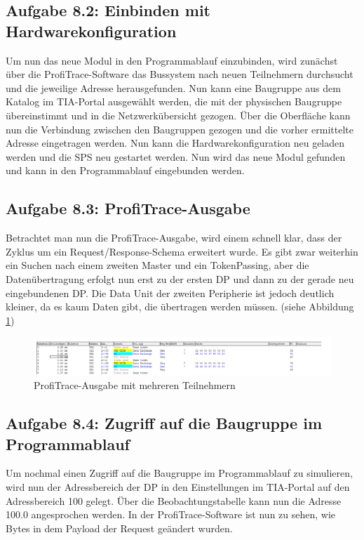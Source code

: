 \documentclass{report}
\begin{document}
\subsection{Aufgabe 8.2: Einbinden mit Hardwarekonfiguration}
Um nun das neue Modul in den Programmablauf einzubinden, wird zunächst über die ProfiTrace-Software das Bussystem nach neuen Teilnehmern durchsucht und die jeweilige Adresse herausgefunden. Nun kann eine Baugruppe aus dem Katalog im TIA-Portal ausgewählt werden, die mit der physischen Baugruppe übereinstimmt und in die Netzwerkübersicht gezogen. Über die Oberfläche kann nun die Verbindung zwischen den Baugruppen gezogen und die vorher ermittelte Adresse eingetragen werden. Nun kann die Hardwarekonfiguration neu geladen werden und die SPS neu gestartet werden. Nun wird das neue Modul gefunden und kann in den Programmablauf eingebunden werden.

\subsection{Aufgabe 8.3: ProfiTrace-Ausgabe}

Betrachtet man nun die ProfiTrace-Ausgabe, wird einem schnell klar, dass der Zyklus um ein Request/Response-Schema erweitert wurde. Es gibt zwar weiterhin ein Suchen nach einem zweiten Master und ein TokenPassing, aber die Datenübertragung erfolgt nun erst zu der ersten DP und dann zu der gerade neu eingebundenen DP. Die Data Unit der zweiten Peripherie ist jedoch deutlich kleiner, da es kaum Daten gibt, die übertragen werden müssen. (siehe Abbildung \ref{fig:profitrace_mehrteilnehmer})

\begin{figure}
  \centering
  \includegraphics[width=\textwidth]{assets/img/profitrace_mehrteilnehmer.png}
  \caption{ProfiTrace-Ausgabe mit mehreren Teilnehmern}
  \label{fig:profitrace_mehrteilnehmer}
\end{figure}

\subsection{Aufgabe 8.4: Zugriff auf die Baugruppe im Programmablauf}

Um nochmal einen Zugriff auf die Baugruppe im Programmablauf zu simulieren, wird nun der Adressbereich der DP in den Einstellungen im TIA-Portal auf den Adressbereich 100 gelegt. Über die Beobachtungstabelle kann nun die Adresse 100.0 angesprochen werden. In der ProfiTrace-Software ist nun zu sehen, wie Bytes in dem Payload der Request geändert wurden. 
\end{document}
